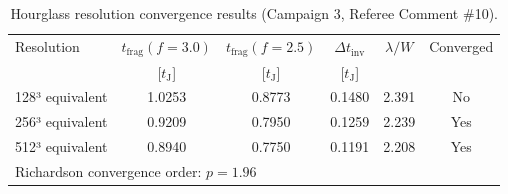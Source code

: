 \begin{table}
\centering
\caption{Hourglass resolution convergence results (Campaign 3, Referee Comment \#10).}
\label{tab:hourglass_resolution}
\begin{tabular}{lccccc}
\hline\hline
Resolution & $t_\mathrm{frag}(f{=}3.0)$ & $t_\mathrm{frag}(f{=}2.5)$ & $\Delta t_\mathrm{inv}$ & $\lambda/W$ & Converged \\
 & [$t_\mathrm{J}$] & [$t_\mathrm{J}$] & [$t_\mathrm{J}$] & & \\
\hline
128³ equivalent & 1.0253 & 0.8773 & 0.1480 & 2.391 & No \\
256³ equivalent & 0.9209 & 0.7950 & 0.1259 & 2.239 & Yes \\
512³ equivalent & 0.8940 & 0.7750 & 0.1191 & 2.208 & Yes \\
\hline
\multicolumn{6}{l}{Richardson convergence order: $p = 1.96$} \\
\hline
\end{tabular}
\end{table}

